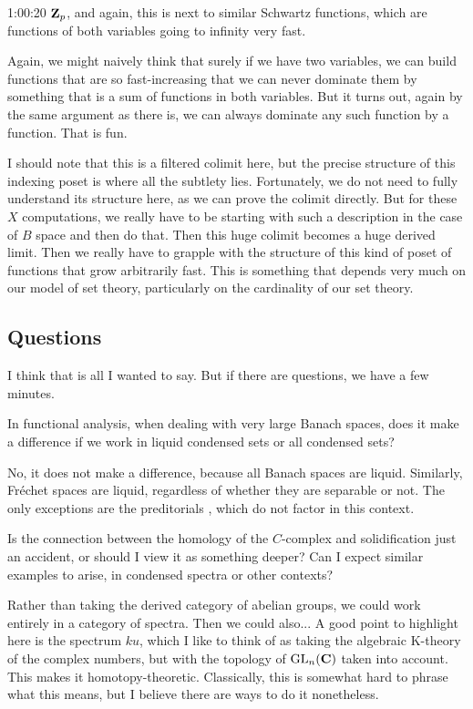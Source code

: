 \begin{unfinished}{1:00:20}
% 
$\mathbf Z_p$, and again, this is next to similar Schwartz functions, which are functions of both variables going to infinity very fast.

% 
Again, we might naively think that surely if we have two variables, we can build functions that are so fast-increasing that we can never dominate them by something that is a sum of functions in both variables. 
But it turns out, again by the same argument as there is, we can always dominate any such function by a function. That is fun.

I should note that this is a filtered colimit here, but the precise structure of this indexing poset is where all the subtlety lies.
%
Fortunately, we do not need to fully understand its structure here, as we can prove the colimit directly.
%
But for these $X$ computations, we really have to be starting with such a description in the case of $B$ space and then do that. 
Then this huge colimit becomes a huge derived limit. Then we really have to grapple with the structure of this kind of poset of functions that grow arbitrarily fast. 
%
This is something that depends very much on our model of set theory, particularly on the cardinality of our set theory.

\subsection{Questions}

% 
I think that is all I wanted to say. But if there are questions, we have a few minutes.

% 
\ques In functional analysis, when dealing with very large Banach spaces, does it make a difference if we work in liquid condensed sets or all condensed sets?

% 
\ans No, it does not make a difference, because all Banach spaces are liquid. Similarly, Fréchet spaces are liquid, regardless of whether they are separable or not. The only exceptions are the preditorials , which do not factor in this context.

\ques Is the connection between the homology of the $C$-complex and solidification just an accident, or should I view it as something deeper? Can I expect similar examples to arise, in condensed spectra or other contexts?

\ans Rather than taking the derived category of abelian groups, we could work entirely in a category of spectra. Then we could also... 
A good point to highlight here is the spectrum $ku$, which I like to think of as taking the algebraic K-theory of the complex numbers, but with the topology of $\operatorname{GL}_n(\mathbf C)$ taken into account. This makes it homotopy-theoretic. Classically, this is somewhat hard to phrase what this means, but I believe there are ways to do it nonetheless.


\end{unfinished}
